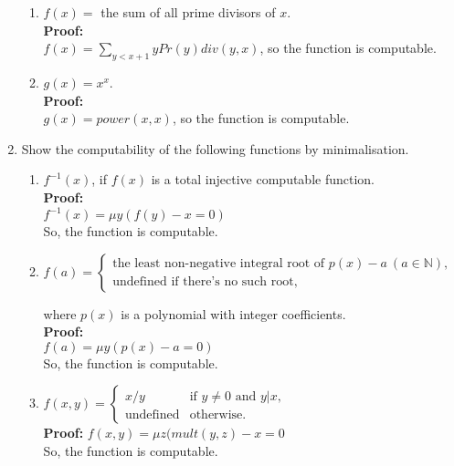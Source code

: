 \documentclass[12pt,a4paper]{article}
\theoremstyle{definition}
\numberwithin{equation}{section}
\numberwithin{figure}{section}
\begin{document}
\begin{enumerate}
\begin{enumerate}
  \item $f(x)=$ the sum of all prime divisors of $x$.\\
  \textbf{Proof:}\\
  $f(x) = \sum_{y < x+1}yPr(y)div(y,x)$, so the function is computable.\\
  
  \item $g(x)=x^x$.\\
  \textbf{Proof:}\\
  $g(x) = power(x,x)$, so the function is computable.\\
\end{enumerate}


  \item Show the computability of the following functions by minimalisation.
    \begin{enumerate}
    \item $f^{-1}(x)$, if $f(x)$ is a total injective computable function.\\
    \textbf{Proof:}\\
    $f^{-1}(x) = \mu y(f(y)-x=0)$\\
    So, the function is computable.
    
    
    \item $f(a)=\left\{\begin{array}{l}
                       \mbox{the least non-negative integral root of } p(x)-a\ (a\in \mathbb{N}),\\
                       \mbox{undefined if there's no such root},
                       \end{array}\right.$  \vspace{1mm}

                       where $p(x)$ is a polynomial with integer coefficients.\\
   \textbf{Proof:}\\
   $f(a)= \mu y(p(x)-a=0)$\\
   So, the function is computable.
                       
    \item $f(x,y)=\left\{\begin{array}{ll}
        x/y & \mbox{if } y\neq 0 \mbox{ and } y|x,\\
        \mbox{undefined} & \mbox{otherwise}.
        \end{array}\right.$\\
   \textbf{Proof:}
   $f(x,y)= \mu z(mult(y,z)-x=0$\\
   So, the function is computable.
   

\end{enumerate}
\end{enumerate}
\end{document}
